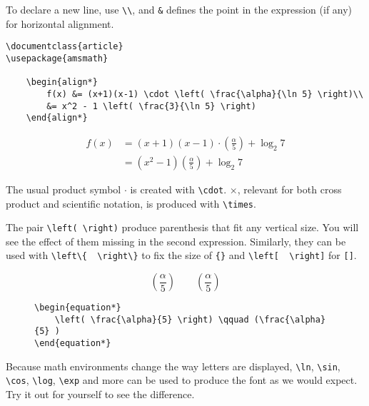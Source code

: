 To declare a new line, use \verb|\\|, and \verb|&| defines the point in the expression (if any) for horizontal alignment.
\begin{lstlisting}
\documentclass{article}
\usepackage{amsmath}

    \begin{align*}
        f(x) &= (x+1)(x-1) \cdot \left( \frac{\alpha}{\ln 5} \right)\\
        &= x^2 - 1 \left( \frac{3}{\ln 5} \right)
    \end{align*}

\end{lstlisting}
\begin{align*}
    f(x) &= (x+1)(x-1) \cdot \left( \frac{\alpha}{5} \right) + \log_{2} 7\\
    &= (x^2 - 1)  (\frac{\alpha}{5} ) + \log_{2} 7
\end{align*}

The usual product symbol \( \cdot \) is created with \verb|\cdot|. \(\times\), relevant for both cross product and scientific notation, is produced with \verb|\times|.

The pair \verb|\left( \right)| produce parenthesis that fit any vertical size.
You will see the effect of them missing in the second expression.
Similarly, they can be used with \verb|\left\{  \right\}| to fix the size of \verb|{}| and \verb|\left[  \right]| for \verb|[]|.
\begin{figure}[h]
\centering
\begin{minipage}{0.40\textwidth}
    \begin{equation*}
        \left( \frac{\alpha}{5} \right) \qquad (\frac{\alpha}{5} )
    \end{equation*}
\end{minipage}
\hfill
\begin{minipage}{0.59\textwidth}
    \begin{lstlisting}
\begin{equation*}
    \left( \frac{\alpha}{5} \right) \qquad (\frac{\alpha}{5} )
\end{equation*}       
\end{lstlisting}    
\end{minipage}
\end{figure}

Because math environments change the way letters are displayed, \verb|\ln|, \verb|\sin|, \verb|\cos|, \verb|\log|, \verb|\exp| and more can be used to produce the font as we would expect. 
Try it out for yourself to see the difference.

